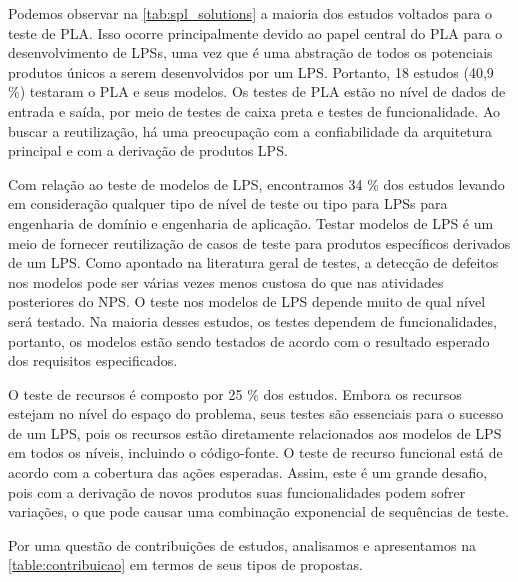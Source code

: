 Podemos observar na \ref{tab:spl_solutions} a maioria dos estudos voltados para o teste de PLA. Isso ocorre principalmente devido ao papel central do PLA para o desenvolvimento de LPSs, uma vez que é uma abstração de todos os potenciais produtos únicos a serem desenvolvidos por um LPS. Portanto, 18 estudos (40,9 \%) testaram o PLA e seus modelos. Os testes de PLA estão no nível de dados de entrada e saída, por meio de testes de caixa preta e testes de funcionalidade. Ao buscar a reutilização, há uma preocupação com a confiabilidade da arquitetura principal e com a derivação de produtos LPS. %

Com relação ao teste de modelos de LPS, encontramos 34 \% dos estudos levando em consideração qualquer tipo de nível de teste ou tipo para LPSs para engenharia de domínio e engenharia de aplicação. Testar modelos de LPS é um meio de fornecer reutilização de casos de teste para produtos específicos derivados de um LPS. Como apontado na literatura geral de testes, a detecção de defeitos nos modelos pode ser várias vezes menos custosa do que nas atividades posteriores do NPS. O teste nos modelos de LPS depende muito de qual nível será testado. Na maioria desses estudos, os testes dependem de funcionalidades, portanto, os modelos estão sendo testados de acordo com o resultado esperado dos requisitos especificados. %

O teste de recursos é composto por 25 \% dos estudos. Embora os recursos estejam no nível do espaço do problema, seus testes são essenciais para o sucesso de um LPS, pois os recursos estão diretamente relacionados aos modelos de LPS em todos os níveis, incluindo o código-fonte. O teste de recurso funcional está de acordo com a cobertura das ações esperadas. Assim, este é um grande desafio, pois com a derivação de novos produtos suas funcionalidades podem sofrer variações, o que pode causar uma combinação exponencial de sequências de teste. %




Por uma questão de contribuições de estudos, analisamos e apresentamos na \ref{table:contribuicao} em termos de seus tipos de propostas.


